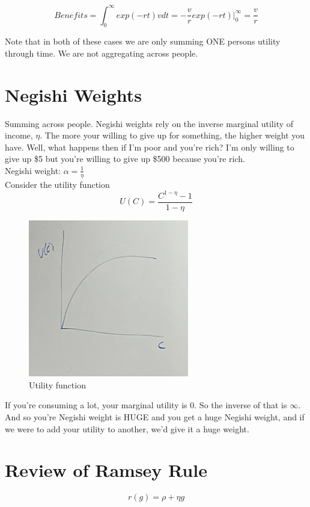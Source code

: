 \documentclass{article}
\begin{document}
$$ Benefits = \int_0^\infty exp(-rt)vdt = - \frac{v}{r}exp(-rt)|_0^\infty = \frac{v}{r}$$

Note that in both of these cases we are only summing ONE persons utility through time. We are not aggregating across people. 

\section{Negishi Weights}
Summing across people. Negishi weights rely on the inverse marginal utility of income, $\eta$.  The more your willing to give up for something, the higher weight you have. Well, what happens then if I'm poor and you're rich? I'm only willing to give up \$5 but you're willing to give up \$500 because you're rich. \\

Negishi weight: $\alpha = \frac{1}{\eta}$\\

Consider the utility function 
$$U(C) = \frac{C^{1-\eta} - 1}{1 - \eta}$$

\begin{figure}[htp]
    \centering
    \includegraphics[width=7cm]{Screen Shot 2023-02-13 at 10.12.33 AM.png}
    \caption{Utility function}
\end{figure}

If you're consuming a lot, your marginal utility is 0. So the inverse of that is $\infty$. And so you're Negishi weight is HUGE and you get a huge Negishi weight, and if we were to add your utility to another, we'd give it a huge weight. 


\section{Review of Ramsey Rule}

$$r(g) = \rho + \eta g$$
\end{document}
